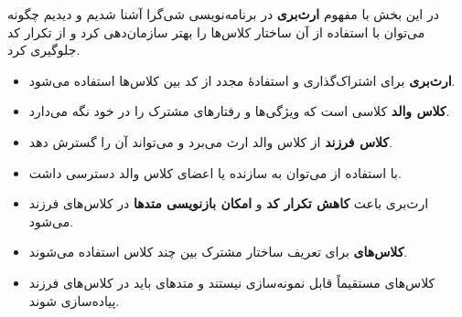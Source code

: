 در این بخش با مفهوم \textbf{ارث‌بری } در برنامه‌نویسی
شی‌گرا آشنا شدیم و دیدیم چگونه می‌توان با استفاده از آن ساختار کلاس‌ها را
بهتر سازمان‌دهی کرد و از تکرار کد جلوگیری کرد.

\begin{itemize}
\tightlist
\item
  \textbf{ارث‌بری} برای اشتراک‌گذاری و استفادهٔ مجدد از کد بین کلاس‌ها
  استفاده می‌شود.
\item
  \textbf{کلاس والد } کلاسی است که ویژگی‌ها و رفتارهای
  مشترک را در خود نگه می‌دارد.
\item
  \textbf{کلاس فرزند } از کلاس والد ارث می‌برد و می‌تواند
  آن را گسترش دهد.
\item
  با استفاده از  می‌توان به سازنده یا اعضای کلاس والد
  دسترسی داشت.
\item
  ارث‌بری باعث \textbf{کاهش تکرار کد} و \textbf{امکان بازنویسی
   متدها} در کلاس‌های فرزند می‌شود.
\item
  \textbf{کلاس‌های } برای تعریف ساختار مشترک بین چند کلاس
  استفاده می‌شوند.
\item
  کلاس‌های  مستقیماً قابل نمونه‌سازی نیستند و متدهای
   باید در کلاس‌های فرزند پیاده‌سازی شوند.
\end{itemize}
	
	
	
	
